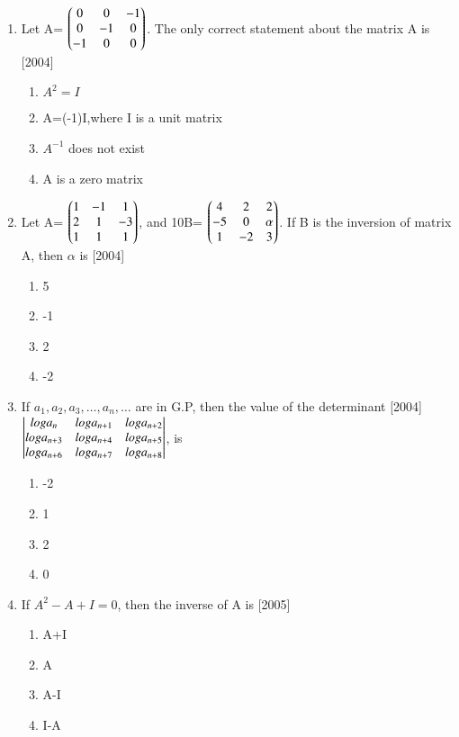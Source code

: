 \documentclass[journal,12pt,twocolumn]{IEEEtran}
\theoremstyle{remark}
\begin{document}
\begin{enumerate}
\item Let A= $\begin{pmatrix}
		0 & 0 & -1 \\
		0 & -1 & 0 \\
		-1 & 0 & 0\end{pmatrix}$. The only correct statement about the matrix A is \hfill{[2004]}
\begin{enumerate}[label=\alph*)]
    \item $A^2=I$
    \item A=(-1)I,where I is a unit matrix
    \item $A^{-1}$ does not exist
    \item A is a zero matrix \\
\end{enumerate} 
\item Let A= $\begin{pmatrix}
		1 & -1 & 1 \\
		2 & 1 & -3 \\
		1 & 1 & 1\end{pmatrix}$, and 10B= $\begin{pmatrix}
		4 & 2 & 2 \\
		-5 & 0 & \alpha \\
		1 & -2 & 3\end{pmatrix}$. If B is the inversion of matrix A, then $\alpha$ is \hfill{[2004]}
\begin{enumerate}[label=\alph*)]
    \item 5
    \item -1
    \item 2
    \item -2 \\
\end{enumerate}
\item If $a_1,a_2,a_3,\dots,a_n,\dots$ are in G.P, then the value of the determinant \hfill{[2004]}
	$\begin{vmatrix}
 loga_{n} & loga_{n+1} & loga_{n+2} \\
 loga_{n+3} & loga_{n+4} & loga_{n+5} \\
 loga_{n+6} & loga_{n+7} & loga_{n+8}\end{vmatrix}$, is
\begin{enumerate}[label=\alph*)]
    \item -2
    \item 1
    \item 2
    \item 0 \\
\end{enumerate}
\item If $A^2-A+I=0$, then the inverse of A is \hfill{[2005]}
\begin{enumerate}[label=\alph*)]
    \item A+I
    \item A
    \item A-I
    \item I-A \\

\end{enumerate}
\end{enumerate}
\end{document}
